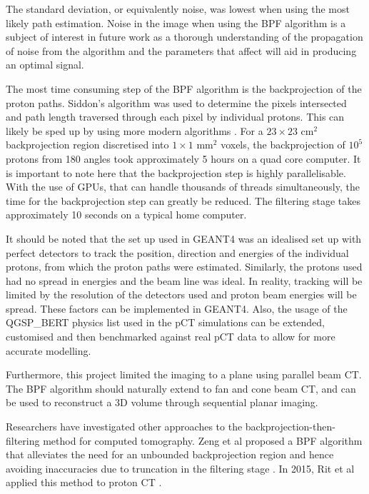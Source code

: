 \documentclass[11pt,a4paper]{article}
\begin{document}
The standard deviation, or equivalently noise, was lowest when using the most likely path estimation. Noise in the image when using the BPF algorithm is a subject of interest in future work as a thorough understanding of the propagation of noise from the algorithm and the parameters that affect will aid in producing an optimal signal.

The most time consuming step of the BPF algorithm is the backprojection of the proton paths. Siddon's algorithm \cite{siddon1985fast} was used to determine the pixels intersected and path length traversed through each pixel by individual protons. This can likely be sped up by using more modern algorithms \cite{jacobs1998fast}. For a $23 \times 23$ cm$^2$ backprojection region discretised into $1 \times 1$ mm$^2$ voxels, the backprojection of $10^5$ protons from 180 angles took approximately 5 hours on a quad core computer. It is important to note here that the backprojection step is highly parallelisable. With the use of GPUs, that can handle thousands of threads simultaneously, the time for the backprojection step can greatly be reduced. The filtering stage takes approximately 10 seconds on a typical home computer.

It should be noted that the set up used in GEANT4 was an idealised set up with perfect detectors to track the position, direction and energies of the individual protons, from which the proton paths were estimated. Similarly, the protons used had no spread in energies and the beam line was ideal. In reality, tracking will be limited by the resolution of the detectors used and proton beam energies will be spread. These factors can be implemented in GEANT4. Also, the usage of the QGSP\_BERT physics list used in the pCT simulations can be extended, customised and then benchmarked against real pCT data to allow for more accurate modelling.

Furthermore, this project limited the imaging to a plane using parallel beam CT. The BPF algorithm should naturally extend to fan and cone beam CT, and can be used to reconstruct a 3D volume through sequential planar imaging. 

Researchers have investigated other approaches to the backprojection-then-filtering method for computed tomography. Zeng et al proposed a BPF algorithm that alleviates the need for an unbounded backprojection region and hence avoiding inaccuracies due to truncation in the filtering stage \cite{zeng2007image}. In 2015, Rit et al applied this method to proton CT \cite{ritlist}.
\end{document}
